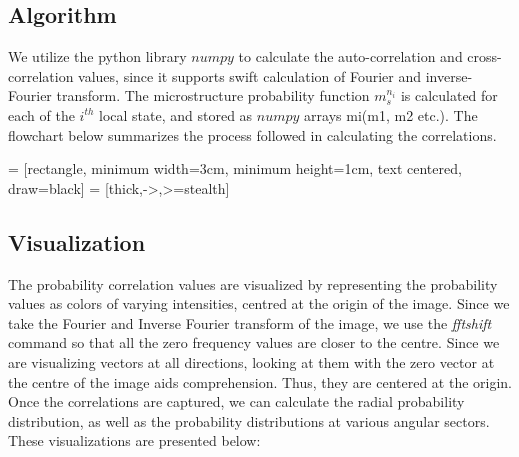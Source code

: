 \documentclass[12pt, a4paper]{report}
\begin{document}
\subsection{Algorithm}
We utilize the python library $numpy$ to calculate the auto-correlation and cross-correlation values, since it supports swift calculation of Fourier and inverse-Fourier transform. The microstructure probability function $m_s^{n_i}$ is calculated for each of the $i^{th}$ local state, and stored as $numpy$ arrays mi(m1, m2 etc.). The flowchart below summarizes the process followed in calculating the correlations.

\usetikzlibrary{shapes.geometric, arrows}
 = [rectangle, minimum width=3cm, minimum height=1cm, text centered, draw=black]
 = [thick,->,>=stealth]
\begin{center}
\end{center}

\subsection{Visualization}
The probability correlation values are visualized by representing the probability values as colors of varying intensities, centred at the origin of the image. Since we take the Fourier and Inverse Fourier transform of the image, we use the \textit{fftshift} command so that all the zero frequency values are closer to the centre. Since we are visualizing vectors at all directions, looking at them with the zero vector at the centre of the image aids comprehension. Thus, they are centered at the origin. Once the correlations are captured, we can calculate the radial probability distribution, as well as the probability distributions at various angular sectors. These visualizations are presented below:
\end{document}

